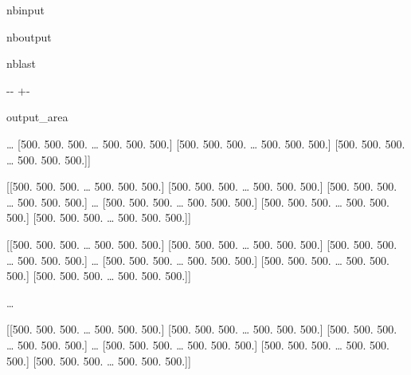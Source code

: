 \documentclass[letterpaper,10pt,english]{sphinxmanual}
\begin{document}
\begin{sphinxuseclass}{nbinput}
{
\begin{sphinxVerbatim}[commandchars=\\\{\}]
\llap{\color{nbsphinxin}[14]:\,\hspace{\fboxrule}\hspace{\fboxsep}}
\end{sphinxVerbatim}
}

\end{sphinxuseclass}
\begin{sphinxuseclass}{nboutput}
\begin{sphinxuseclass}{nblast}
{

\kern-\sphinxverbatimsmallskipamount\kern-\baselineskip
\kern+\FrameHeightAdjust\kern-\fboxrule
\vspace{\nbsphinxcodecellspacing}

\begin{sphinxuseclass}{output_area}
\begin{sphinxuseclass}{}


\begin{sphinxVerbatim}[commandchars=\\\{\}]
[[[500. 500. 500. {\ldots} 500. 500. 500.]
  [500. 500. 500. {\ldots} 500. 500. 500.]
  [500. 500. 500. {\ldots} 500. 500. 500.]
  {\ldots}
  [500. 500. 500. {\ldots} 500. 500. 500.]
  [500. 500. 500. {\ldots} 500. 500. 500.]
  [500. 500. 500. {\ldots} 500. 500. 500.]]

 [[500. 500. 500. {\ldots} 500. 500. 500.]
  [500. 500. 500. {\ldots} 500. 500. 500.]
  [500. 500. 500. {\ldots} 500. 500. 500.]
  {\ldots}
  [500. 500. 500. {\ldots} 500. 500. 500.]
  [500. 500. 500. {\ldots} 500. 500. 500.]
  [500. 500. 500. {\ldots} 500. 500. 500.]]

 [[500. 500. 500. {\ldots} 500. 500. 500.]
  [500. 500. 500. {\ldots} 500. 500. 500.]
  [500. 500. 500. {\ldots} 500. 500. 500.]
  {\ldots}
  [500. 500. 500. {\ldots} 500. 500. 500.]
  [500. 500. 500. {\ldots} 500. 500. 500.]
  [500. 500. 500. {\ldots} 500. 500. 500.]]

 {\ldots}

 [[500. 500. 500. {\ldots} 500. 500. 500.]
  [500. 500. 500. {\ldots} 500. 500. 500.]
  [500. 500. 500. {\ldots} 500. 500. 500.]
  {\ldots}
  [500. 500. 500. {\ldots} 500. 500. 500.]
  [500. 500. 500. {\ldots} 500. 500. 500.]
  [500. 500. 500. {\ldots} 500. 500. 500.]]


\end{sphinxVerbatim}
\end{sphinxuseclass}
\end{sphinxuseclass}}
\end{sphinxuseclass}
\end{sphinxuseclass}
\end{document}
